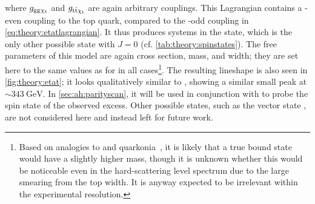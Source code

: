 \noindent where $g_{\mathrm{gg} \mathrm{\chi_t}}$ and $g_{\mathrm{t \bar{t}} \mathrm{\chi_t}}$ are again arbitrary couplings. This Lagrangian contains a \CP-even coupling to the top quark, compared to the \CP-odd coupling in \cref{eq:theory:etatlagrangian}. It thus produces \ttbar systems in the  state, which is the only other possible state with $J = 0$ (cf. \cref{tab:theory:spinstates}). The free parameters of this model are again cross section, mass, and width; they are set here to the same values as for \etat in all cases\footnote{Based on analogies to \ccbar and \bbbar quarkonia~\cite{Barnes:2005pb}, it is likely that a true  bound state would have a slightly higher mass, though it is unknown whether this would be noticeable even in the hard-scattering level spectrum due to the large smearing from the top width. It is anyway expected to be irrelevant within the experimental resolution.}. The resulting \mWWbb lineshape is also seen in \cref{fig:theory:etat}; it looks qualitatively similar to \etat, showing a similar small peak at $\sim \SI{343}{\GeV}$. In \cref{sec:ah:parityscan}, it will be used in conjunction with \etat to probe the spin state of the observed excess. Other possible states, such as the vector state , are not considered here and instead left for future work.








